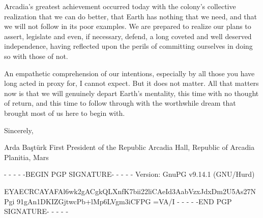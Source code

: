 Arcadia's greatest achievement occurred today with the colony's collective realization that we can do better, that Earth has nothing that we need, and that we will not follow in its poor examples. We are prepared to realize our plans to assert, legislate and even, if necessary, defend, a long coveted and well deserved independence, having reflected upon the perils of committing ourselves in doing so with those of not. 

An empathetic comprehension of our intentions, especially by all those you have long acted in proxy for, I cannot expect. But it does not matter. All that matters now is that we will genuinely depart Earth's mentality, this time with no thought of return, and this time to follow through with the worthwhile dream that brought most of us here to begin with.

Sincerely, 

\hskip 1cm 
   
Arda Baştürk
First President of the Republic
Arcadia Hall, Republic of Arcadia Planitia, Mars

- - - - -BEGIN PGP SIGNATURE- - - - -
Version: GnuPG v9.14.1 (GNU/Hurd)

EYAECRCAYAFAl6wk2gACgkQLXnfK7bii22liCAeId3AabVzxJdxDm2U5As27NPgi
91gAn1DKIZGjtwcPb+lMp6LVgm3iCFPG
=VA/I
- - - - -END PGP SIGNATURE- - - - -
\stoplines

